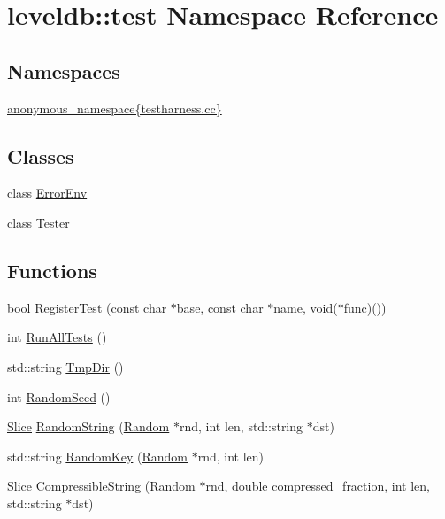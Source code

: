 \hypertarget{namespaceleveldb_1_1test}{}\section{leveldb\+:\+:test Namespace Reference}
\label{namespaceleveldb_1_1test}
\subsection*{Namespaces}
\begin{DoxyCompactItemize}
\item 
 \hyperlink{namespaceleveldb_1_1test_1_1anonymous__namespace_02testharness_8cc_03}{anonymous\+\_\+namespace\{testharness.\+cc\}}
\end{DoxyCompactItemize}
\subsection*{Classes}
\begin{DoxyCompactItemize}
\item 
class \hyperlink{classleveldb_1_1test_1_1_error_env}{Error\+Env}
\item 
class \hyperlink{classleveldb_1_1test_1_1_tester}{Tester}
\end{DoxyCompactItemize}
\subsection*{Functions}
\begin{DoxyCompactItemize}
\item 
bool \hyperlink{namespaceleveldb_1_1test_aecde3e0440c4462e8d73aad728e3e819}{Register\+Test} (const char $\ast$base, const char $\ast$name, void($\ast$func)())
\item 
int \hyperlink{namespaceleveldb_1_1test_a3329162c54a0bff42d41c2ac86b2580a}{Run\+All\+Tests} ()
\item 
std\+::string \hyperlink{namespaceleveldb_1_1test_ac259aab85eedba03d163bb3a86ae4645}{Tmp\+Dir} ()
\item 
int \hyperlink{namespaceleveldb_1_1test_a0d48ce23bccd2763df90789cb3aac03c}{Random\+Seed} ()
\item 
\hyperlink{classleveldb_1_1_slice}{Slice} \hyperlink{namespaceleveldb_1_1test_a2132c5f28cd21dcea4348246fa32b673}{Random\+String} (\hyperlink{classleveldb_1_1_random}{Random} $\ast$rnd, int len, std\+::string $\ast$dst)
\item 
std\+::string \hyperlink{namespaceleveldb_1_1test_ae6faec2042472bb9c3da124a677c4b96}{Random\+Key} (\hyperlink{classleveldb_1_1_random}{Random} $\ast$rnd, int len)
\item 
\hyperlink{classleveldb_1_1_slice}{Slice} \hyperlink{namespaceleveldb_1_1test_ad213d475feebfeb1c860151ed824f318}{Compressible\+String} (\hyperlink{classleveldb_1_1_random}{Random} $\ast$rnd, double compressed\+\_\+fraction, int len, std\+::string $\ast$dst)
\end{DoxyCompactItemize}


